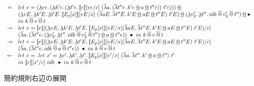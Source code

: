 \documentclass[japanese,draft]{jssst_ppl} %
\begin{document}
\begin{figure}[h]
\[\begin{array}{cl}
  = & let\ v =  \DLamP{ve}{\DLamP{k'e}{\DLamP{t'e}{\CPSTh{e}[\Change{c}{ve}]\
              \SLamP{a}{\SLamP{t''e}{k'e \DAppS a \DAppS t''e}}\ t'e}}}\DAppS\\
      & \DLamP{vE}{\DLam{k'E}{\DLam{t'E}{\CPSTh{E_p[x]}[\Change{x}{vE}]\
              \SLamP{aE}{\SLam{t''E}{k'E \DAppS aE \DAppS t''E}}\ t'E}}} \DAppS
                    \DLamP{v_2'}{\DLam{t''}
                      {\SApp{\SApp{idk}{v_2'}}{t''}}}\DAppS{\bullet}\\
                    & in\ k\SAppS v \SAppS t\\

  \to & let\ v = \CPSTh{e}[\Change{c}{\DLamP{vE}{\DLam{k'E}{\DLam{t'E}{\CPSTh{E_p[x]}[\Change{x}{vE}] \SLamP{aE}{\SLam{t''E}{k'E \DAppS aE \DAppS t''E}}\ t'E}}}}]\\
        & \SLamP{a}{\SLamP{t''e}{\DLamP{v_2'}{\DLam{t''}
              {\SApp{\SApp{idk}{v_2'}}{t''}}} \DAppS a \DAppS t''e}}\ \bullet
  \ in\
  k\SAppS v \SAppS t\\

  \to & let\ v = \CPSTh{e}[\Change{c}{\DLamP{vE}{\DLam{k'E}{\DLam{t'E}{\CPSTh{E_p[x]}[\Change{x}{vE}] \SLamP{aE}{\SLam{t''E}{k'E \DAppS aE \DAppS t''E}}\ t'E}}}}]\\
        & \SLamP{a}{\SLamP{t''e}{
              \SApp{\SApp{idk}{a}}{t''e}}}\ \bullet
  \ in\
  k\SAppS v \SAppS t\\

  \leftarrow & let\ v =\ let\ x'=
  \DLam{v'}{\DLam{k'}{\DLam{t'}{\CPSTh{E_p[x]}[\Change{x}{v'}]\
        \SLamP{a}{\SLam{t''}{k' \DAppS a \DAppS t''}}\ t'}}}\ \\
  & in\ \CPSTh{e}[\Change{c}{x'}]\
  idk\ \bullet \ in\ k\SAppS v \SAppS t\\
\end{array}
\]
\caption{簡約規則右辺の展開}
\label{ControlReRight}
\end{figure}
\\
\\
\end{document}
